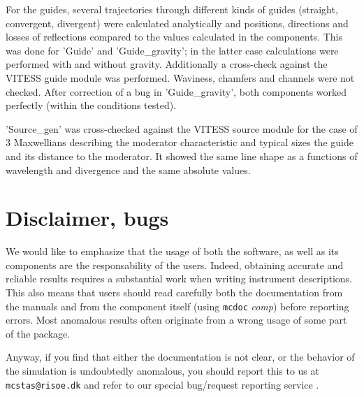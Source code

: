 For the guides, several trajectories through different kinds of guides (straight, convergent, divergent) were calculated analytically and positions, directions and losses of reflections compared to the values calculated in the components. This was done for 'Guide' and 'Guide\_gravity'; in the latter case calculations were performed with and without gravity. Additionally a cross-check against the VITESS guide module was performed. Waviness, chamfers and channels were not checked.
After correction of a bug in 'Guide\_gravity', both components worked perfectly (within the conditions tested).

'Source\_gen' was cross-checked against the VITESS source module for the case of 3 Maxwellians describing the moderator characteristic and typical sizes the guide and its distance to the moderator. It showed the same line shape as a functions of wavelength and divergence and the same absolute values.

\section{Disclaimer, bugs}

We would like to emphasize that the usage of both the \MCS software, as well as its components are the responsability of the users. Indeed, obtaining accurate and reliable results requires a substantial work when writing instrument descriptions. This also means that users should read carefully both the documentation from the manuals \cite{mcstasmanual} and from the component itself (using \verb+mcdoc+ {\it comp}) before reporting errors. Most anomalous results often originate from a wrong usage of some part of the package.

Anyway, if you find that either the documentation is not clear, or the behavior of the simulation is undoubtedly anomalous, you should report this to us at \verb+mcstas@risoe.dk+ and refer to our special bug/request reporting service \cite{github_issue_webpage}.
